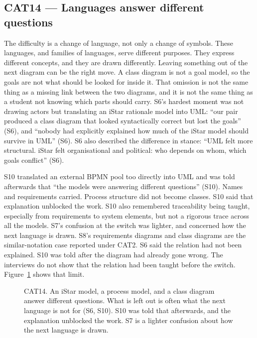 \subsection{CAT14 --- Languages answer different questions}
\label{sec:cat14}

The difficulty is a change of language, not only a change of symbols. These languages, and families of languages, serve different purposes. They express different concepts, and they are drawn differently. Leaving something out of the next diagram can be the right move. A class diagram is not a goal model, so the goals are not what should be looked for inside it. That omission is not the same thing as a missing link between the two diagrams, and it is not the same thing as a student not knowing which parts should carry. S6's hardest moment was not drawing actors but translating an iStar rationale model into UML: ``our pair produced a class diagram that looked syntactically correct but lost the goals'' (S6), and ``nobody had explicitly explained how much of the iStar model should survive in UML'' (S6). S6 also described the difference in stance: ``UML felt more structural. iStar felt organisational and political: who depends on whom, which goals conflict'' (S6).

S10 translated an external BPMN pool too directly into UML and was told afterwards that ``the models were answering different questions'' (S10). Names and requirements carried. Process structure did not become classes. S10 said that explanation unblocked the work. S10 also remembered traceability being taught, especially from requirements to system elements, but not a rigorous trace across all the models. S7's confusion at the switch was lighter, and concerned how the next language is drawn. S8's requirements diagrams and class diagrams are the similar-notation case reported under CAT2. S6 said the relation had not been explained. S10 was told after the diagram had already gone wrong. The interviews do not show that the relation had been taught before the switch. Figure~\ref{fig:cat14} shows that limit.

\begin{figure}[htbp]
\centering

\caption{CAT14. An iStar model, a process model, and a class diagram answer different questions. What is left out is often what the next language is not for (S6, S10). S10 was told that afterwards, and the explanation unblocked the work. S7 is a lighter confusion about how the next language is drawn.}
\label{fig:cat14}
\end{figure}

